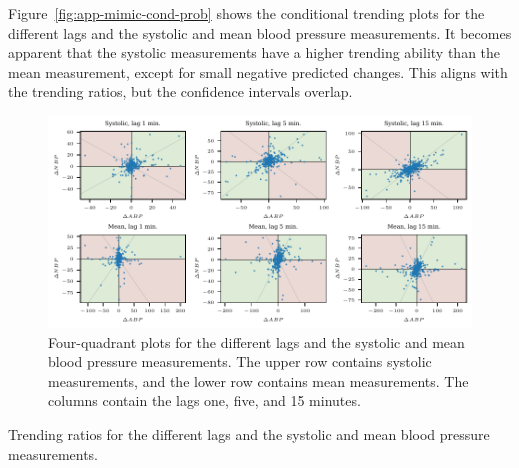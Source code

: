 Figure~\ref{fig:app-mimic-cond-prob} shows the conditional trending plots for the different lags and the systolic and mean blood pressure measurements.
It becomes apparent that the systolic measurements have a higher trending ability than the mean measurement, except for small negative predicted changes.
This aligns with the trending ratios, but the confidence intervals overlap.

\begin{figure}
    \centering
    \includegraphics{plots/mimic/plot_4q}
    \caption{Four-quadrant plots for the different lags and the systolic and mean blood pressure measurements. The upper row contains systolic measurements, and the lower row contains mean measurements. The columns contain the lags one, five, and 15 minutes.}
    \label{fig:app-mimic-4q}
\end{figure}

\begin{table}
    \centering
    
    \caption{Trending ratios for the different lags and the systolic and mean blood pressure measurements.}
    \label{tab:app-mimic-trending-ratios}
\end{table}

